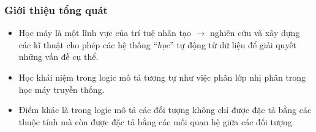 \documentclass[fleqn]{beamer}
\begin{document}
%  
%  

\begin{frame}\frametitle{\bf Giới thiệu tổng quát}
\begin{itemize}
  \item Học máy là một lĩnh vực của trí tuệ nhân tạo $\rightarrow$ nghiên cứu và xây dựng các kĩ thuật cho phép các hệ thống ``{\em học}'' tự động từ dữ liệu để giải quyết những vấn đề cụ thể.
  \vspace{1.0ex}
  
  \item Học khái niệm trong logic mô tả tương tự như việc phân lớp nhị phân trong học máy truyền thống. 
  \vspace{1.0ex}
  
  \item Điểm khác là trong logic mô tả các đối tượng không chỉ được đặc tả bằng các thuộc tính mà còn được đặc tả bằng các mối quan hệ giữa các đối tượng.
\end{itemize}
\end{frame}
\end{document}
